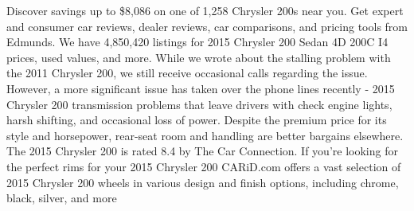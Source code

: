\begin{tcolorbox}[colback=gray!20, colframe=gray!75, rounded corners, sharp corners=northeast, sharp corners=southwest]
{Discover savings up to \$8,086 on one of 1,258 Chrysler 200s near you. Get expert and consumer car reviews, dealer reviews, car comparisons, and pricing tools from Edmunds. We have 4,850,420 listings for 2015 Chrysler 200 Sedan 4D 200C I4 prices, used values, and more. While we wrote about the stalling problem with the 2011 Chrysler 200, we still receive occasional calls regarding the issue. However, a more significant issue has taken over the phone lines recently - 2015 Chrysler 200 transmission problems that leave drivers with check engine lights, harsh shifting, and occasional loss of power. Despite the premium price for its style and horsepower, rear-seat room and handling are better bargains elsewhere. The 2015 Chrysler 200 is rated 8.4 by The Car Connection. If you're looking for the perfect rims for your 2015 Chrysler 200 CARiD.com offers a vast selection of 2015 Chrysler 200 wheels in various design and finish options, including chrome, black, silver, and more}
\end{tcolorbox}

\clearpage

